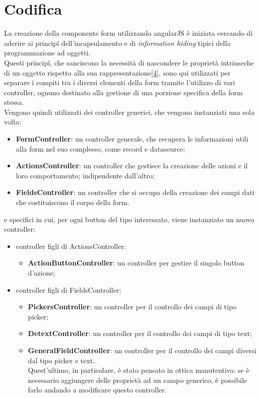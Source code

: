 \section{Codifica}
La creazione della componente form utilizzando angularJS è iniziata cercando di aderire ai principî dell'incapsulamento e di \emph{information hiding} tipici della programmazione ad oggetti.\\ Questi principî, che sanciscono la necessità di nascondere le proprietà intrinseche di un oggetto rispetto alla sua rappresentazione\hyperlink{04}{[4]}, sono qui utilizzati per separare i compiti tra i diversi elementi della form tramite l'utilizzo di vari controller, ognuno destinato alla gestione di una porzione specifica della form stessa.\\
Vengono quindi utilizzati dei controller generici, che vengono instanziati una sola volta:
\begin{itemize}
	\item \textbf{FormController}: un controller generale, che recupera le informazioni utili alla form nel suo complesso, come record e datasource;
	\item \textbf{ActionsController}: un controller che gestisce la creazione delle azioni e il loro comportamento; indipendente dall'altro;
	\item \textbf{FieldsController}: un controller che si occupa della creazione dei campi dati che costituiscono il corpo della form.
\end{itemize}
e specifici in cui, per ogni button del tipo interessato, viene instanziato un nuovo controller:
\begin{itemize}
	\item controller figli di ActionsController:
	\begin{itemize}
		\item \textbf{ActionButtonController}: un controller per gestire il singolo button d'azione;
	\end{itemize} 
	\item controller figli di FieldsController:
	\begin{itemize}
		\item \textbf{PickersController}: un controller per il controllo dei campi di tipo picker;
		\item \textbf{DetextController}: un controller per il controllo dei campi di tipo text;
		\item \textbf{GeneralFieldController}: un controller per il controllo dei campi diversi dal tipo picker e text. \\Quest'ultimo, in particolare, è stato pensato in ottica manutentiva: se è necessario aggiungere delle proprietà ad un campo generico, è possibile farlo andando a modificare questo controller.
	\end{itemize} 
\end{itemize} 

